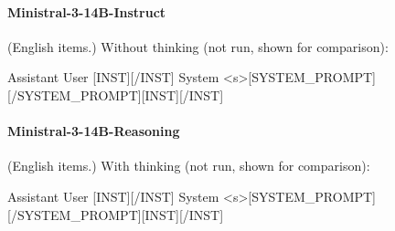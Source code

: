 \paragraph{Ministral-3-14B-Instruct} (English items.)
\noindent Without thinking (not run, shown for comparison):
\begin{Rendering}
Assistant  
User       [INST]\NL{}\NL{}[/INST]
System     <s>[SYSTEM_PROMPT][/SYSTEM_PROMPT][INST][/INST]
\end{Rendering}
\paragraph{Ministral-3-14B-Reasoning} (English items.)
\noindent With thinking (not run, shown for comparison):
\begin{Rendering}
Assistant  
User       [INST]\NL{}\NL{}[/INST]
System     <s>[SYSTEM_PROMPT][/SYSTEM_PROMPT][INST][/INST]
\end{Rendering}
